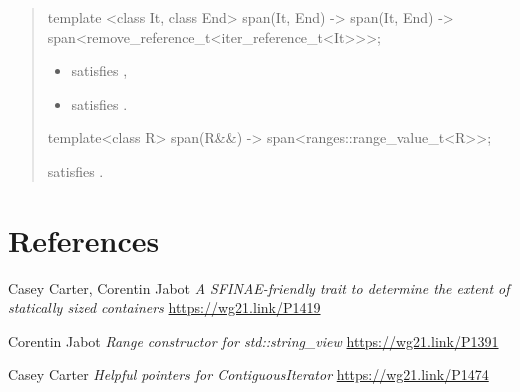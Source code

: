 \documentclass{wg21}
\begin{document}
\begin{quote}
\begin{addedblock}
\begin{itemdecl}
template <class It, class End>
span(It, End) -> span(It, End) -> span<remove_reference_t<iter_reference_t<It>>>;
\end{itemdecl}
\begin{itemdescr}
    \constraints
\begin{itemize}
    \item {} satisfies ,
    \item {} satisfies .
\end{itemize}

\end{itemdescr}

\begin{itemdecl}
template<class R>
span(R&&) -> span<ranges::range_value_t<R>>;
\end{itemdecl}
\begin{itemdescr}
    \constraints {} satisfies .
\end{itemdescr}


\end{addedblock}

\end{quote}

\section{References}
\renewcommand{\section}[2]{}%
\begin{thebibliography}{9}

    Casey Carter, Corentin Jabot
    \emph{A SFINAE-friendly trait to determine the extent of statically sized containers}\newline
    \url{https://wg21.link/P1419}

    Corentin Jabot
    \emph{Range constructor for std::string\_view}\newline
    \url{https://wg21.link/P1391}


    Casey Carter
    \emph{Helpful pointers for ContiguousIterator}\newline
    \url{https://wg21.link/P1474}


\end{thebibliography}
\end{document}
